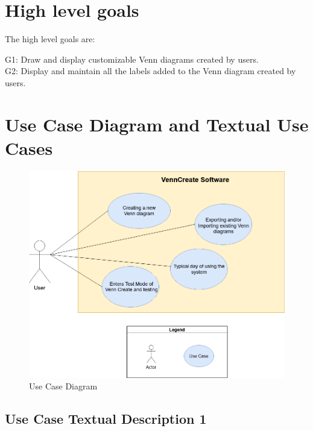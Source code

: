 \documentclass[fontsize=12pt,paper=letter,twoside]{scrartcl}
\begin{document}
\newpage
\section{High level goals}
The high level goals are:

\begin{description}
	\item[G1: Draw and display customizable Venn diagrams created by users.]
	\item[G2: Display and maintain all the labels added to the Venn diagram created by users.]
\end{description}

\newpage
\section{Use Case Diagram and Textual Use Cases}

\begin{figure}[hbt]
	\begin{mdframed}
		\includegraphics[width=\textwidth]{images/use-case-diagram.png}
	\end{mdframed}
	\caption{Use Case Diagram}
\end{figure}

\newpage

\subsection*{Use Case Textual Description 1}
\end{document}
